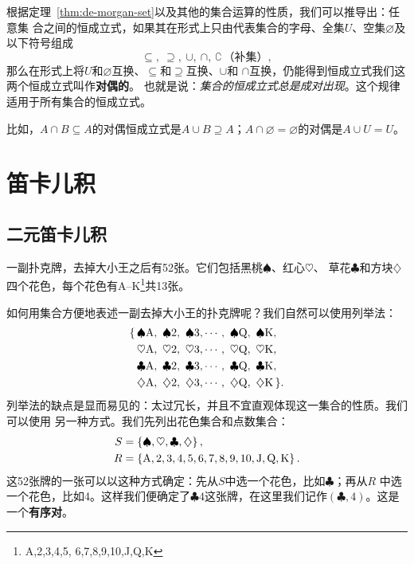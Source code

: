 根据定理~\ref{thm:de-morgan-set}以及其他的集合运算的性质，我们可以推导出：任意集
合之间的恒成立式，如果其在形式上只由代表集合的字母、全集$U$、空集$\varnothing$及
以下符号组成
\[
    \subseteq,\ \supseteq,\ \cup,\ \cap,\ \complement\,\text{（补集）},
\]
那么在形式上将$U$和$\varnothing$互换、$\subseteq$和$\supseteq$互换、$\cup$和
$\cap$互换，仍能得到恒成立式我们这两个恒成立式叫作\textbf{对偶的}。
也就是说：\emph{集合的恒成立式总是成对出现}。这个规律适用于所有集合的恒成立式。

比如，$A \cap B \subseteq A$的对偶恒成立式是$A \cup B \supseteq A$；$A \cap 
\varnothing = \varnothing$的对偶是$A \cup U = U$。 


\section{笛卡儿积}

\subsection{二元笛卡儿积}

一副扑克牌，去掉大小王之后有52张。它们包括黑桃$\spadesuit$、红心$\heartsuit$、
草花$\clubsuit$和方块$\diamondsuit$四个花色，每个花色有A--K\footnote{A,2,3,4,5,%
6,7,8,9,10,J,Q,K}共13张。

如何用集合方便地表述一副去掉大小王的扑克牌呢？我们自然可以使用列举法：
\begin{align*}
    \{\, &\spadesuit \ace,\ \spadesuit 2,\ \spadesuit 3,\cdots,\ \spadesuit \queen,\ 
    \spadesuit \king, \\
       &\heartsuit \ace,\ \heartsuit 2,\ \heartsuit 3,\cdots,\ \heartsuit \queen,\ 
    \heartsuit \king, \\
       &\clubsuit \ace,\ \clubsuit 2,\ \clubsuit 3,\cdots,\ \clubsuit \queen,\ 
    \clubsuit \king, \\
       &\diamondsuit \ace,\ \diamondsuit 2,\ \diamondsuit 3,\cdots,\ \diamondsuit \queen,\ 
    \diamondsuit \king\, \}.
\end{align*}
列举法的缺点是显而易见的：太过冗长，并且不宜直观体现这一集合的性质。我们可以使用
另一种方式。我们先列出花色集合和点数集合：
\begin{align*}
    S &= \left\{ \spadesuit,\heartsuit,\clubsuit,\diamondsuit \right\},\\
    R &= \left\{ \text{A},2,3,4,5,6,7,8,9,10,\text{J},\text{Q},\text{K} \right\}.
\end{align*}
这52张牌的一张可以以这种方式确定：先从$S$中选一个花色，比如$\clubsuit$；再从$R$
中选一个花色，比如4。这样我们便确定了$\clubsuit 4$这张牌，在这里我们记作$\left( 
\clubsuit, 4\right) $。这是一个\textbf{有序对}\index{有序对}。

